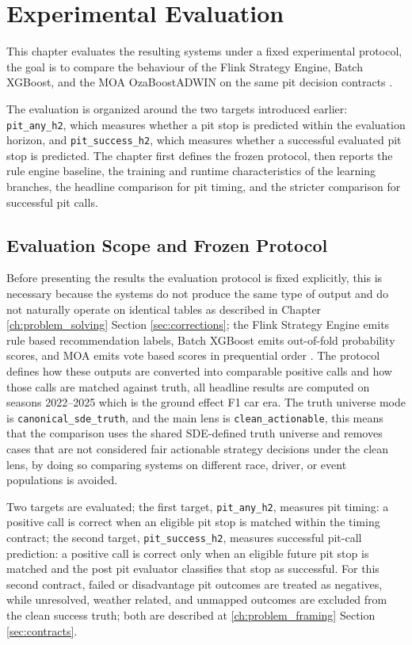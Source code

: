 \chapter{Experimental Evaluation}
\label{ch:experimental_evaluation}

This chapter evaluates the resulting systems under a fixed experimental protocol,
the goal is to compare the behaviour of the Flink Strategy Engine, Batch XGBoost, and the MOA OzaBoostADWIN on the same pit decision contracts 
\cite{chen2016xgboost,bifet2010moa,oza2005boosting,bifet2007adwin}.

The evaluation is organized around the two targets introduced earlier: \texttt{pit\_any\_h2}, which measures whether a pit stop is predicted within the evaluation
horizon, and \texttt{pit\_success\_h2}, which measures whether a successful evaluated pit stop is predicted. The chapter first defines the frozen protocol, then reports
the rule engine baseline, the training and runtime characteristics of the learning branches, the headline comparison for pit timing, and the stricter comparison for successful
pit calls.

\section{Evaluation Scope and Frozen Protocol}

Before presenting the results the evaluation protocol is fixed explicitly, this is necessary because the systems do not produce the same type of output and do not naturally
operate on identical tables as described in Chapter \ref{ch:problem_solving} Section \ref{sec:corrections}; the Flink Strategy Engine emits rule based recommendation labels,
Batch XGBoost emits out-of-fold probability scores, and MOA emits vote based scores
in prequential order \cite{chen2016xgboost,bifet2010moa,oza2005boosting,bifet2007adwin}. The protocol defines how these outputs are converted into comparable positive calls and 
how those calls are matched against truth,
all headline results are computed on seasons 2022--2025 which is the ground effect F1 car era. The truth universe mode is \texttt{canonical\_sde\_truth}, and the main lens is 
\texttt{clean\_actionable}, this means
that the comparison uses the shared SDE-defined truth universe and removes cases that are not considered fair actionable strategy decisions under the clean lens, by doing so
comparing systems on different race, driver, or event populations is avoided.

Two targets are evaluated; the first target, \texttt{pit\_any\_h2}, measures pit timing: a positive call is correct when an eligible pit stop is matched within the timing
contract; the second target, \texttt{pit\_success\_h2}, measures successful pit-call prediction: a positive call is correct only when an eligible future pit stop is matched
and the post pit evaluator classifies that stop as successful. For this second contract, failed or disadvantage pit outcomes are treated as negatives, while unresolved,
weather related, and unmapped outcomes are excluded from the clean success truth;
both are described at \ref{ch:problem_framing} Section \ref{sec:contracts}.

